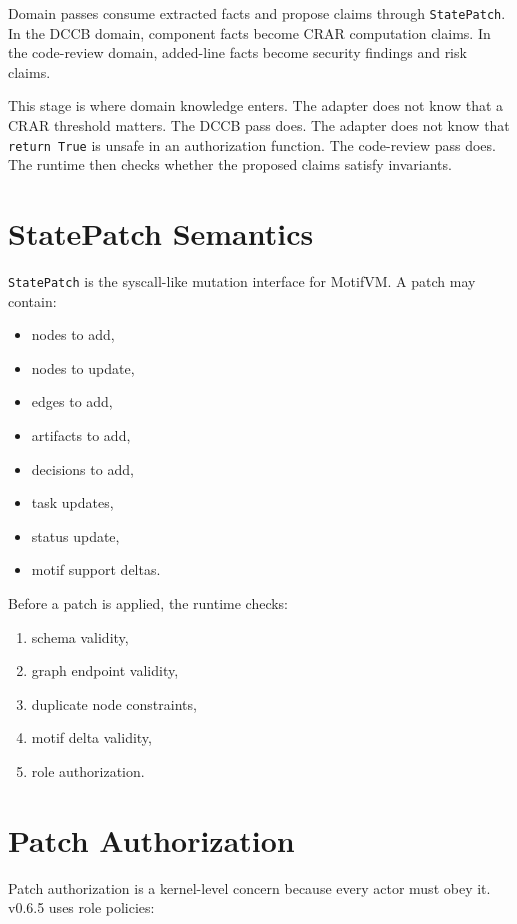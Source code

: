 \documentclass[11pt]{article}
\begin{document}
Domain passes consume extracted facts and propose claims through \texttt{StatePatch}. In the DCCB domain, component facts become CRAR computation claims. In the code-review domain, added-line facts become security findings and risk claims.

This stage is where domain knowledge enters. The adapter does not know that a CRAR threshold matters. The DCCB pass does. The adapter does not know that \texttt{return True} is unsafe in an authorization function. The code-review pass does. The runtime then checks whether the proposed claims satisfy invariants.

\section{StatePatch Semantics}

\texttt{StatePatch} is the syscall-like mutation interface for MotifVM. A patch may contain:

\begin{itemize}[leftmargin=1.5em]
  \item nodes to add,
  \item nodes to update,
  \item edges to add,
  \item artifacts to add,
  \item decisions to add,
  \item task updates,
  \item status update,
  \item motif support deltas.
\end{itemize}

Before a patch is applied, the runtime checks:

\begin{enumerate}[leftmargin=1.5em]
  \item schema validity,
  \item graph endpoint validity,
  \item duplicate node constraints,
  \item motif delta validity,
  \item role authorization.
\end{enumerate}

\section{Patch Authorization}

Patch authorization is a kernel-level concern because every actor must obey it. v0.6.5 uses role policies:
\end{document}

